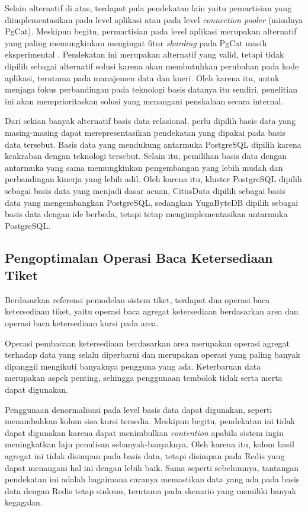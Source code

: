 Selain alternatif di atas, terdapat pula pendekatan lain yaitu pemartisian yang diimplementasikan pada level aplikasi atau pada level \textit{connection pooler} (misalnya PgCat). Meskipun begitu, permartisian pada level aplikasi merupakan alternatif yang paling memungkinkan mengingat fitur \textit{sharding} pada PgCat masih eksperimental \parencite{pgcat}. Pendekatan ini merupakan alternatif yang valid, tetapi tidak dipilih sebagai alternatif solusi karena akan membutuhkan perubahan pada kode aplikasi, terutama pada manajemen data dan kueri. Oleh karena itu, untuk menjaga fokus perbandingan pada teknologi basis datanya itu sendiri, penelitian ini akan memprioritaskan solusi yang menangani penskalaan secara internal.

Dari sekian banyak alternatif basis data relasional, perlu dipilih basis data yang masing-masing dapat merepresentasikan pendekatan yang dipakai pada basis data tersebut. Basis data yang mendukung antarmuka PostgreSQL dipilih karena keakraban dengan teknologi tersebut. Selain itu, pemilihan basis data dengan antarmuka yang sama memungkinkan pengembangan yang lebih mudah dan perbandingan kinerja yang lebih adil. Oleh karena itu, kluster PostgreSQL dipilih sebagai basis data yang menjadi dasar acuan, CitusData dipilih sebagai basis data yang mengembangkan PostgreSQL, sedangkan YugaByteDB dipilih sebagai basis data dengan ide berbeda, tetapi tetap mengimplementasikan antarmuka PostgreSQL.

\subsection{Pengoptimalan Operasi Baca Ketersediaan Tiket}

Berdasarkan referensi pemodelan sistem tiket, terdapat dua operasi baca ketersediaan tiket, yaitu operasi baca agregat ketersediaan berdasarkan area dan operasi baca ketersediaan kursi pada area.

Operasi pembacaan ketersediaan berdasarkan area merupakan operasi agregat terhadap data yang selalu diperbarui dan merupakan operasi yang paling banyak dipanggil mengikuti banyaknya pengguna yang ada. Keterbaruan data merupakan aspek penting, sehingga penggunaan tembolok tidak serta merta dapat digunakan.

Penggunaan denormalisasi pada level basis data dapat digunakan, seperti menambahkan kolom sisa kursi tersedia. Meskipun begitu, pendekatan ini tidak dapat digunakan karena dapat menimbulkan \textit{contention} apabila sistem ingin meningkatkan laju penulisan sebanyak-banyaknya. Oleh karena itu, kolom hasil agregat ini tidak disimpan pada basis data, tetapi disimpan pada Redis yang dapat menangani hal ini dengan lebih baik. Sama seperti sebelumnya, tantangan pendekatan ini adalah bagaimana caranya memastikan data yang ada pada basis data dengan Redis tetap sinkron, terutama pada skenario yang memiliki banyak kegagalan.

